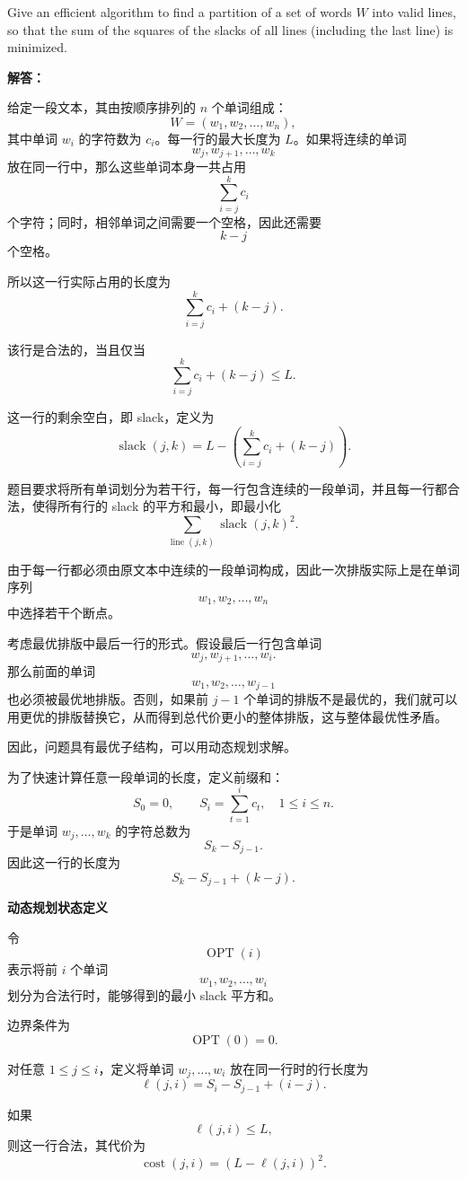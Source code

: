 \documentclass[12pt,a4paper]{article}
\begin{document}
Give an efficient algorithm to find a partition of a set of words $W$ into valid lines, so that the sum of the squares of the slacks of all lines (including the last line) is minimized.

\begin{answerbox}
\textbf{解答：}

给定一段文本，其由按顺序排列的 $n$ 个单词组成：
\[
W = (w_1,w_2,\ldots,w_n),
\]
其中单词 $w_i$ 的字符数为 $c_i$。每一行的最大长度为 $L$。如果将连续的单词
\[
w_j,w_{j+1},\ldots,w_k
\]
放在同一行中，那么这些单词本身一共占用
\[
\sum_{i=j}^{k} c_i
\]
个字符；同时，相邻单词之间需要一个空格，因此还需要
\[
k-j
\]
个空格。

所以这一行实际占用的长度为
\[
\sum_{i=j}^{k} c_i + (k-j).
\]

该行是合法的，当且仅当
\[
\sum_{i=j}^{k} c_i + (k-j) \le L.
\]

这一行的剩余空白，即 slack，定义为
\[
\operatorname{slack}(j,k)
=
L-\left(\sum_{i=j}^{k} c_i + (k-j)\right).
\]

题目要求将所有单词划分为若干行，每一行包含连续的一段单词，并且每一行都合法，使得所有行的 slack 的平方和最小，即最小化
\[
\sum_{\text{line }(j,k)} \operatorname{slack}(j,k)^2.
\]

由于每一行都必须由原文本中连续的一段单词构成，因此一次排版实际上是在单词序列
\[
w_1,w_2,\ldots,w_n
\]
中选择若干个断点。

考虑最优排版中最后一行的形式。假设最后一行包含单词
\[
w_j,w_{j+1},\ldots,w_i.
\]
那么前面的单词
\[
w_1,w_2,\ldots,w_{j-1}
\]
也必须被最优地排版。否则，如果前 $j-1$ 个单词的排版不是最优的，我们就可以用更优的排版替换它，从而得到总代价更小的整体排版，这与整体最优性矛盾。

因此，问题具有最优子结构，可以用动态规划求解。

为了快速计算任意一段单词的长度，定义前缀和：
\[
S_0 = 0,
\qquad
S_i = \sum_{t=1}^{i} c_t,\quad 1\le i\le n.
\]
于是单词 $w_j,\ldots,w_k$ 的字符总数为
\[
S_k-S_{j-1}.
\]
因此这一行的长度为
\[
S_k-S_{j-1}+(k-j).
\]

\textbf{动态规划状态定义}

令
\[
\operatorname{OPT}(i)
\]
表示将前 $i$ 个单词
\[
w_1,w_2,\ldots,w_i
\]
划分为合法行时，能够得到的最小 slack 平方和。

边界条件为
\[
\operatorname{OPT}(0)=0.
\]

对任意 $1\le j\le i$，定义将单词 $w_j,\ldots,w_i$ 放在同一行时的行长度为
\[
\ell(j,i)=S_i-S_{j-1}+(i-j).
\]

如果
\[
\ell(j,i)\le L,
\]
则这一行合法，其代价为
\[
\operatorname{cost}(j,i)
=
\left(L-\ell(j,i)\right)^2.
\]


\end{answerbox}
\end{document}
